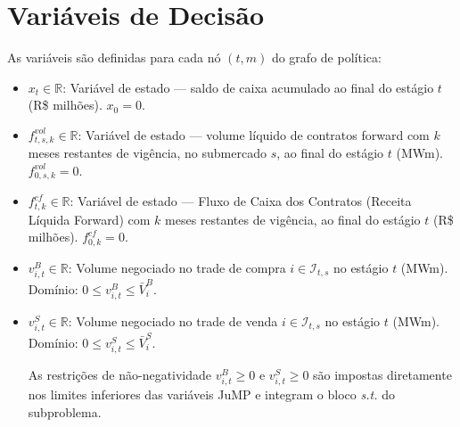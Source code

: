 \documentclass{article}
\begin{document}
\section{Variáveis de Decisão}

As variáveis são definidas para cada nó $(t, m)$ do grafo de política:

\begin{itemize}

    \item $x_t \in \mathbb{R}$: Variável de estado — saldo de caixa acumulado ao final do
    estágio $t$ (R\$ milhões). $x_0 = 0$.

    \item $f^{vol}_{t,s,k} \in \mathbb{R}$: Variável de estado — volume líquido de contratos
    forward com $k$ meses restantes de vigência, no submercado $s$, ao final do estágio $t$
    (MWm). $f^{vol}_{0,s,k} = 0$.

    \item $f^{cf}_{t,k} \in \mathbb{R}$: Variável de estado --- Fluxo de Caixa dos Contratos
    (Receita Líquida Forward) com $k$ meses restantes de vigência, ao final do estágio $t$
    (R\$ milhões). $f^{cf}_{0,k} = 0$.

    \item $v^{B}_{i,t} \in \mathbb{R}$: Volume negociado no trade de compra $i \in \mathcal{I}_{t,s}$
    no estágio $t$ (MWm). Domínio: $0 \leq v^{B}_{i,t} \leq \bar{V}^{B}_{i}$.

    \item $v^{S}_{i,t} \in \mathbb{R}$: Volume negociado no trade de venda $i \in \mathcal{I}_{t,s}$
    no estágio $t$ (MWm). Domínio: $0 \leq v^{S}_{i,t} \leq \bar{V}^{S}_{i}$.

    \noindent As restrições de não-negatividade $v^{B}_{i,t} \geq 0$ e $v^{S}_{i,t} \geq 0$
    são impostas diretamente nos limites inferiores das variáveis JuMP e integram o bloco
    \emph{s.t.} do subproblema.


\end{itemize}
\end{document}
